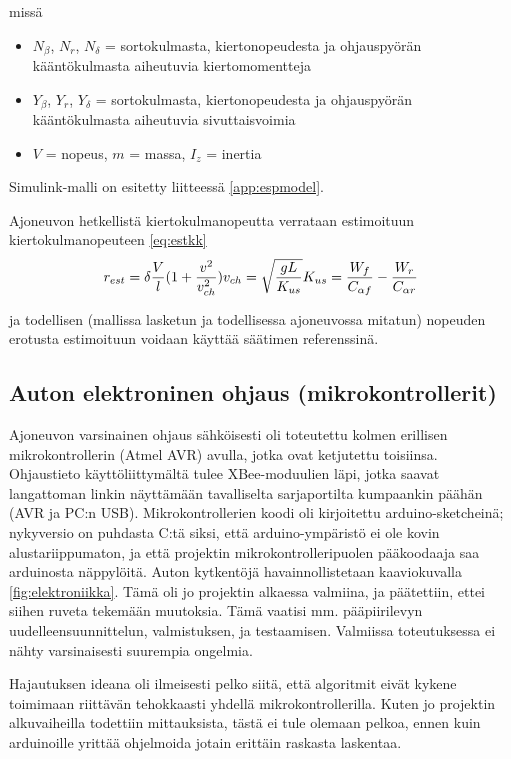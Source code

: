 \documentclass{article}
\begin{document}
missä

\begin{itemize}
	\item $N_\beta$, $N_r$, $N_\delta$ = sortokulmasta, kiertonopeudesta ja ohjauspyörän kääntökulmasta aiheutuvia kiertomomentteja
	\item $Y_\beta$, $Y_r$, $Y_\delta$ = sortokulmasta, kiertonopeudesta ja ohjauspyörän kääntökulmasta aiheutuvia sivuttaisvoimia
	\item $V$ = nopeus, $m$ = massa, $I_z$ = inertia
\end{itemize}

Simulink-malli on esitetty liitteessä \ref{app:espmodel}.

Ajoneuvon hetkellistä kiertokulmanopeutta verrataan estimoituun kiertokulmanopeuteen \ref{eq:estkk}
\begin{equation} \label{eq:estkk}
r_{est} = \delta \frac{V}{l} (1 + \frac{v^2}{v_{ch}^2}) \\
v_{ch} = \sqrt{\frac{gL}{K_{us}}} \\
K_{us} = \frac{W_f}{C_{\alpha f}}-\frac{W_r}{C_{\alpha r}}
\end{equation}

ja todellisen (mallissa lasketun ja todellisessa ajoneuvossa mitatun) nopeuden erotusta estimoituun voidaan käyttää säätimen referenssinä.

\subsection{Auton elektroninen ohjaus (mikrokontrollerit)}

Ajoneuvon varsinainen ohjaus sähköisesti oli toteutettu kolmen erillisen mikrokontrollerin (Atmel AVR) avulla, jotka ovat ketjutettu toisiinsa. Ohjaustieto käyttöliittymältä tulee XBee-moduulien läpi, jotka saavat langattoman linkin näyttämään tavalliselta sarjaportilta kumpaankin päähän (AVR ja PC:n USB). Mikrokontrollerien koodi oli kirjoitettu arduino-sketcheinä; nykyversio on puhdasta C:tä siksi, että arduino-ympäristö ei ole kovin alustariippumaton, ja että projektin mikrokontrolleripuolen pääkoodaaja saa arduinosta näppylöitä. Auton kytkentöjä havainnollistetaan kaaviokuvalla \ref{fig:elektroniikka}. Tämä oli jo projektin alkaessa valmiina, ja päätettiin, ettei siihen ruveta tekemään muutoksia. Tämä vaatisi mm. pääpiirilevyn uudelleensuunnittelun, valmistuksen, ja testaamisen. Valmiissa toteutuksessa ei nähty varsinaisesti suurempia ongelmia.

Hajautuksen ideana oli ilmeisesti pelko siitä, että algoritmit eivät kykene toimimaan riittävän tehokkaasti yhdellä mikrokontrollerilla. Kuten jo projektin alkuvaiheilla todettiin mittauksista, tästä ei tule olemaan pelkoa, ennen kuin arduinoille yrittää ohjelmoida jotain erittäin raskasta laskentaa.
\end{document}

